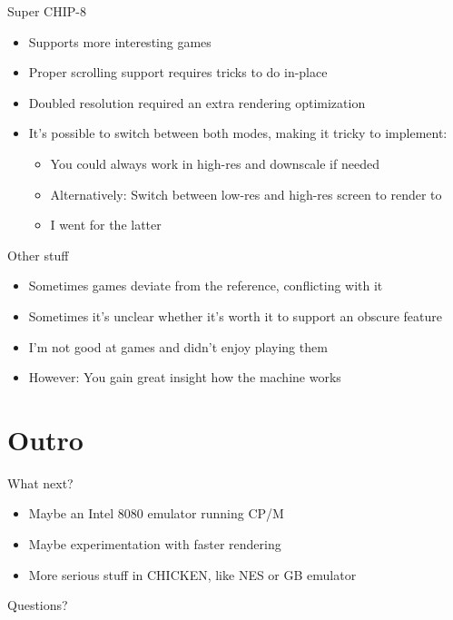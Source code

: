 \documentclass[presentation]{beamer}
\begin{document}
\begin{frame}[label={sec:org40c51e0}]{Super CHIP-8}
\begin{itemize}
\item Supports more interesting games
\item Proper scrolling support requires tricks to do in-place
\item Doubled resolution required an extra rendering optimization
\item It's possible to switch between both modes, making it tricky to
implement:
\begin{itemize}
\item You could always work in high-res and downscale if needed
\item Alternatively: Switch between low-res and high-res screen to
render to
\item I went for the latter
\end{itemize}
\end{itemize}
\end{frame}

\begin{frame}[label={sec:orga1710c3}]{Other stuff}
\begin{itemize}
\item Sometimes games deviate from the reference, conflicting with it
\item Sometimes it's unclear whether it's worth it to support an obscure
feature
\item I'm not good at games and didn't enjoy playing them
\item However: You gain great insight how the machine works
\end{itemize}
\end{frame}

\section{Outro}
\label{sec:org734f4e8}

\begin{frame}[label={sec:org9dc929e}]{What next?}
\begin{itemize}
\item Maybe an Intel 8080 emulator running CP/M
\item Maybe experimentation with faster rendering
\item More serious stuff in CHICKEN, like NES or GB emulator
\end{itemize}
\end{frame}

\begin{frame}[label={sec:org112ed00}]{Questions?}
\end{frame}
\end{document}
